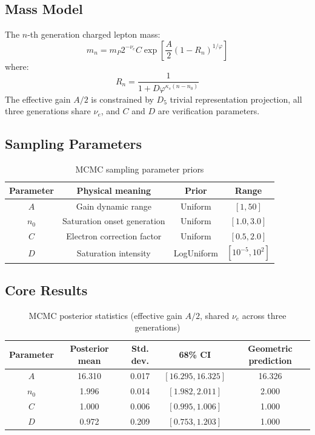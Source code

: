 \documentclass[12pt,a4paper,twocolumn]{article}
\renewcommand{\phi}{\varphi}
\begin{document}
\subsection{Mass Model}
The $n$-th generation charged lepton mass:
\[
m_n = m_P 2^{-\nu_e} C \exp\left[\frac{A}{2}(1-R_n)^{1/\phi}\right]
\]
where:
\[
R_n = \frac{1}{1+D\phi^{\kappa_s(n-n_0)}}
\]
The effective gain $A/2$ is constrained by $D_5$ trivial representation projection, all three generations share $\nu_e$, and $C$ and $D$ are verification parameters.

\subsection{Sampling Parameters}
\begin{table}[H]
\centering
\footnotesize
\caption{MCMC sampling parameter priors}
\begin{tabular}{c|c|c|c}
\hline
\textbf{Parameter} & \textbf{Physical meaning} & \textbf{Prior} & \textbf{Range} \\
\hline
$A$ & Gain dynamic range & Uniform & $[1,50]$ \\
$n_0$ & Saturation onset generation & Uniform & $[1.0,3.0]$ \\
$C$ & Electron correction factor & Uniform & $[0.5,2.0]$ \\
$D$ & Saturation intensity & LogUniform & $[10^{-5},10^2]$ \\
\hline
\end{tabular}
\end{table}

\subsection{Core Results}
\begin{table}[H]
\centering
\footnotesize
\caption{MCMC posterior statistics (effective gain $A/2$, shared $\nu_e$ across three generations)}
\begin{tabular}{c|c|c|c|c}
\hline
\textbf{Parameter} & \textbf{Posterior mean} & \textbf{Std. dev.} & \textbf{68\% CI} & \textbf{Geometric prediction} \\
\hline
$A$ & 16.310 & 0.017 & $[16.295,16.325]$ & 16.326 \\
$n_0$ & 1.996 & 0.014 & $[1.982,2.011]$ & 2.000 \\
$C$ & 1.000 & 0.006 & $[0.995,1.006]$ & 1.000 \\
$D$ & 0.972 & 0.209 & $[0.753,1.203]$ & 1.000 \\
\hline
\end{tabular}
\end{table}
\end{document}
